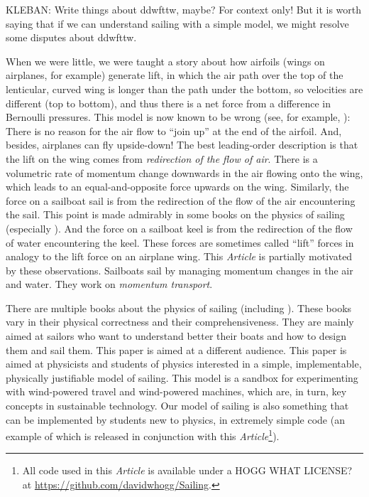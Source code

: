 \documentclass[letterpaper]{article}
\newcommand{\documentname}{\textsl{Article}}
\begin{document}
KLEBAN: Write things about ddwfttw, maybe? For context only! But it is worth saying that if we can understand sailing with a simple model, we might resolve some disputes about ddwfttw.

When we were little, we were taught a story about how airfoils (wings on airplanes, for example) generate lift, in which the air path over the top of the lenticular, curved wing is longer than the path under the bottom, so velocities are different (top to bottom), and thus there is a net force from a difference in Bernoulli pressures.
This model is now known to be wrong (see, for example, \cite{lift}):
There is no reason for the air flow to ``join up'' at the end of the airfoil.
And, besides, airplanes can fly upside-down!
The best leading-order description is that the lift on the wing comes from \emph{redirection of the flow of air}.
There is a volumetric rate of momentum change downwards in the air flowing onto the wing, which leads to an equal-and-opposite force upwards on the wing.
Similarly, the force on a sailboat sail is from the redirection of the flow of the air encountering the sail.
This point is made admirably in some books on the physics of sailing (especially \cite{sails}).
And the force on a sailboat keel is from the redirection of the flow of water encountering the keel.
These forces are sometimes called ``lift'' forces in analogy to the lift force on an airplane wing.
This \documentname{} is partially motivated by these observations.
Sailboats sail by managing momentum changes in the air and water.
They work on \emph{momentum transport}.

There are multiple books about the physics of sailing (including \cite{symmetry, explained, sails, pos}).
These books vary in their physical correctness and their comprehensiveness.
They are mainly aimed at sailors who want to understand better their boats and how to design them and sail them.
This paper is aimed at a different audience.
This paper is aimed at physicists and students of physics interested in a simple, implementable, physically justifiable model of sailing.
This model is a sandbox for experimenting with wind-powered travel and wind-powered machines, which are, in turn, key concepts in sustainable technology.
Our model of sailing is also something that can be implemented by students new to physics, in extremely simple code (an example of which is released in conjunction with this \documentname\footnote{All code used in this \documentname{} is available under a HOGG WHAT LICENSE? at \url{https://github.com/davidwhogg/Sailing}.}).
\end{document}
